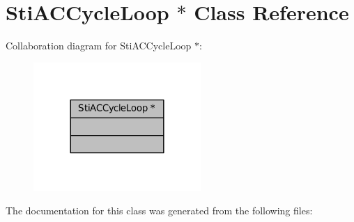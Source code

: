 \hypertarget{classStiACCycleLoop_01_5}{}\section{Sti\+A\+C\+Cycle\+Loop $\ast$ Class Reference}
\label{classStiACCycleLoop_01_5}


Collaboration diagram for Sti\+A\+C\+Cycle\+Loop $\ast$\+:
\nopagebreak
\begin{figure}[H]
\begin{center}
\leavevmode
\includegraphics[width=180pt]{classStiACCycleLoop_01_5__coll__graph}
\end{center}
\end{figure}


The documentation for this class was generated from the following files\+: